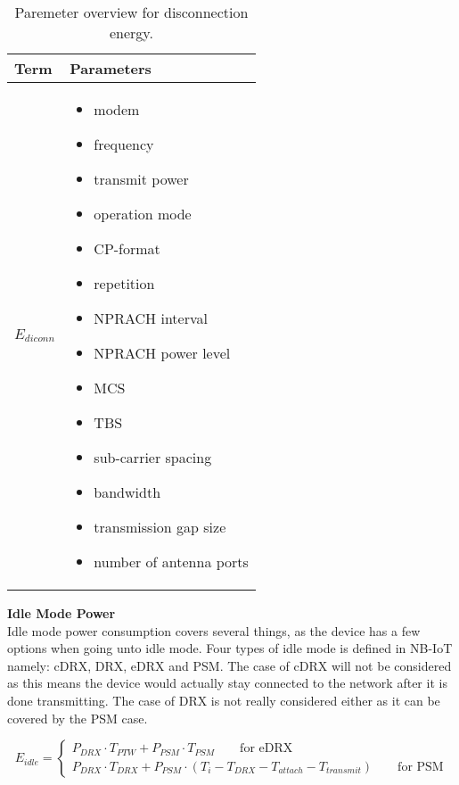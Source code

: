 \begin{table}[H]
\centering
\begin{tabular}{|m{3cm}|m{6cm}|} \hline
\textbf{Term} & \textbf{Parameters} \\ \hline
$E_{diconn}$ & \begin{itemize}
\item modem 
\item frequency
\item transmit power
\item operation mode
\item \gls{CP}-format
\item repetition
\item NPRACH interval
\item NPRACH power level
\item \gls{MCS}
\item \gls{TBS}
\item sub-carrier spacing
\item bandwidth
\item transmission gap size
\item number of antenna ports
\end{itemize} \\ \hline
\end{tabular}
\caption{Paremeter overview for disconnection energy.}
\label{tab:Erelease_parameter_overview}
\end{table}

\textbf{Idle Mode Power}\\
Idle mode power consumption covers several things, as the device has a few options when going unto idle mode. Four types of idle mode is defined in \gls{NB-IoT} namely: \gls{cDRX}, \gls{DRX}, \gls{eDRX} and \gls{PSM}. The case of cDRX will not be considered as this means the device would actually stay connected to the network after it is done transmitting. The case of DRX is not really considered either as it can be covered by the PSM case. 
  
\begin{equation}
E_{idle} = \begin{cases} P_{DRX}\cdot T_{PTW}+P_{PSM}\cdot T_{PSM} \qquad \text{for eDRX}\\
			 P_{DRX}\cdot T_{DRX} + P_{PSM}\cdot (T_i-T_{DRX}-T_{attach}-T_{transmit}) \qquad \text{for PSM}
		   \end{cases}
\end{equation}
\begin{where}
\end{where}

